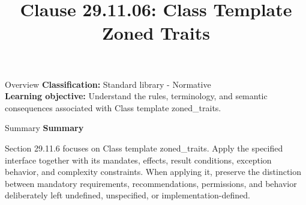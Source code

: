 \documentclass[10pt,letterpaper]{article}
\title{Clause 29.11.06: Class Template Zoned Traits}
\author{}
\date{}
\begin{document}
\maketitle
\begin{CornellOverviewBox}{Overview}
\textbf{Classification:} Standard library - Normative\\[2pt]
\textbf{Learning objective:} Understand the rules, terminology, and semantic consequences associated with Class template zoned\_traits.
\end{CornellOverviewBox}\begin{CornellSummaryBox}{Summary}
{\sffamily\bfseries\color{Accent} Summary}\par\vspace{3pt}Section 29.11.6 focuses on Class template zoned\_traits. Apply the specified interface together with its mandates, effects, result conditions, exception behavior, and complexity constraints. When applying it, preserve the distinction between mandatory requirements, recommendations, permissions, and behavior deliberately left undefined, unspecified, or implementation-defined.
\end{CornellSummaryBox}
\end{document}
